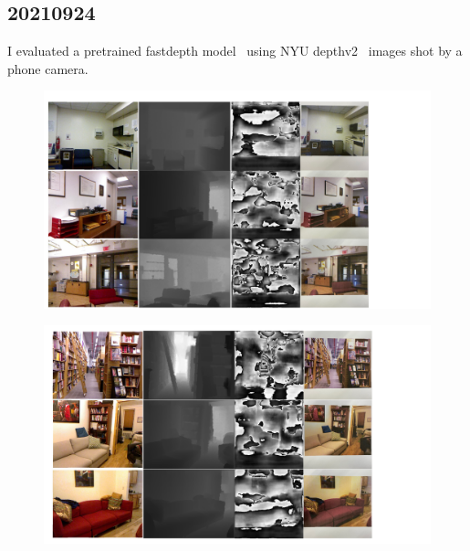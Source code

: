 \documentclass[10pt]{beamer}
\begin{document}
\subsection{20210924}
\begin{frame}
  I evaluated a pretrained fastdepth model~\cite{fastdepth} using NYU
  depthv2~\cite{nyudepthv2} images shot by a phone camera.  

  \begin{figure}
    \includegraphics[width=1\linewidth]{figure/20210924/depth_real_1.pdf}
  \end{figure}
  \end{frame}

\begin{frame}
  \begin{figure}
    \includegraphics[width=1\linewidth]{figure/20210924/depth_real_2.pdf}
  \end{figure}
\end{frame}
\end{document}
